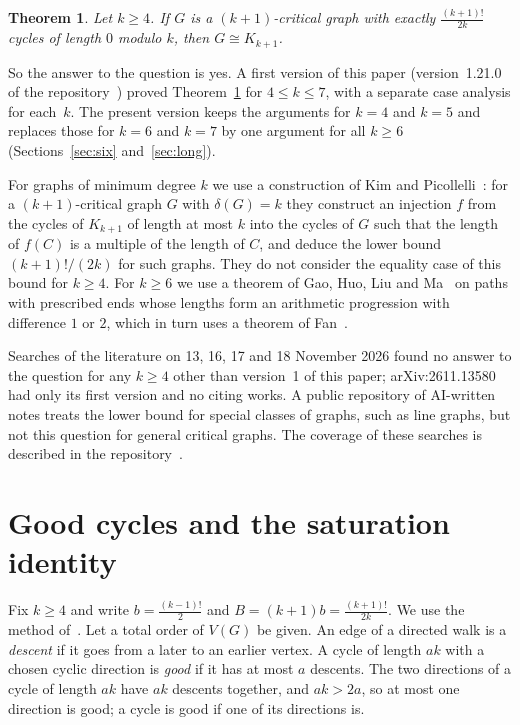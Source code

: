 \documentclass[11pt]{article}
\newtheorem{theorem}{Theorem}
\theoremstyle{remark}
\begin{document}
\begin{theorem}\label{thm:main}
Let $k\ge4$. If $G$ is a $(k+1)$-critical graph with exactly
$\frac{(k+1)!}{2k}$ cycles of length $0$ modulo $k$, then $G\cong K_{k+1}$.
\end{theorem}

So the answer to the question is yes. A first version of this paper
(version~1.21.0 of the repository~\cite{repo}) proved Theorem~\ref{thm:main}
for $4\le k\le7$, with a separate case analysis for each~$k$. The present
version keeps the arguments for $k=4$ and $k=5$ and replaces those for $k=6$
and $k=7$ by one argument for all $k\ge6$ (Sections~\ref{sec:six}
and~\ref{sec:long}).

For graphs of minimum degree $k$ we use a construction of Kim and
Picollelli~\cite[Theorem~2.4 and Corollary~2.5]{kp}: for a $(k+1)$-critical
graph $G$ with $\delta(G)=k$ they construct an injection $f$ from the cycles of
$K_{k+1}$ of length at most $k$ into the cycles of $G$ such that the length of
$f(C)$ is a multiple of the length of $C$, and deduce the lower bound
$(k+1)!/(2k)$ for such graphs. They do not consider the equality case of this
bound for $k\ge4$. For $k\ge6$ we use a theorem of Gao, Huo, Liu and
Ma~\cite[Theorem~3.1]{ghlm} on paths with prescribed ends whose lengths form an
arithmetic progression with difference $1$ or $2$, which in turn uses a theorem of
Fan~\cite{fan}.

Searches of the literature on 13, 16, 17 and 18 November 2026 found no answer to the
question for any $k\ge4$ other than version~1 of this paper; arXiv:2611.13580
had only its first version and no citing works. A public repository of
AI-written notes treats the lower bound for special classes of graphs, such as
line graphs, but not this question for general critical graphs. The coverage
of these searches is described in the repository~\cite{repo}.

\section{Good cycles and the saturation identity}\label{sec:good}

Fix $k\ge4$ and write $b=\frac{(k-1)!}{2}$ and $B=(k+1)b=\frac{(k+1)!}{2k}$.
We use the method of~\cite{cs}. Let a total order of $V(G)$ be given. An edge of
a directed walk is a \emph{descent} if it goes from a later to an earlier
vertex. A cycle of length $ak$ with a chosen cyclic direction is \emph{good} if
it has at most $a$ descents. The two directions of a cycle of length $ak$ have
$ak$ descents together, and $ak>2a$, so at most one direction is good; a cycle
is good if one of its directions is.
\end{document}
